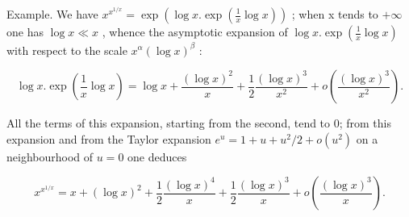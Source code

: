Example. We have \(x^{x^{1/x}} = \exp\left(\log x. \exp\left(\frac{1}{x} \log x\right)\right)\) ; when x tends to \(+\infty\) one has \(\log x \ll x\) , whence the asymptotic expansion of \(\log x. \exp\left(\frac{1}{x} \log x\right)\) with respect to the scale \(x^{\alpha}(\log x)^{\beta}\) :

\[
\log x. \exp \left(\frac {1}{x} \log x\right) = \log x + \frac {(\log x) ^ {2}}{x} + \frac {1}{2} \frac {(\log x) ^ {3}}{x ^ {2}} + o \left(\frac {(\log x) ^ {3}}{x ^ {2}}\right).
\]

All the terms of this expansion, starting from the second, tend to 0; from this expansion and from the Taylor expansion \(e^u = 1 + u + u^2 / 2 + o(u^2)\) on a neighbourhood of \(u = 0\) one deduces

\[
x ^ {x ^ {1 / x}} = x + (\log x) ^ {2} + \frac {1}{2} \frac {(\log x) ^ {4}}{x} + \frac {1}{2} \frac {(\log x) ^ {3}}{x} + o \left(\frac {(\log x) ^ {3}}{x}\right).
\]


